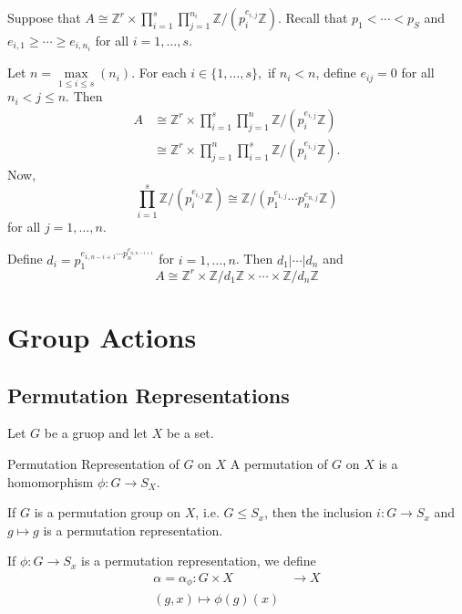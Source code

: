 \documentclass{article}
\begin{document}
Suppose that $A \cong \mathbb{Z}^r \times \prod_{i=1}^s \prod_{j=1}^{n_i} \mathbb{Z}/(p_i^{e_{i,j}}\mathbb{Z})$. Recall that $p_1<\cdots < p_S$ and $e_{i,1}\ge \cdots \ge e_{i,n_i}$ for all $i=1,\dots, s$.

Let $n=\underset{1\le i \le s}{\max}(n_i)$. For each $i\in \{1,\dots, s\},$ if $n_i < n$, define $e_{ij}=0$ for all $n_i < j \le n$. Then
\begin{align*}
    A &\cong \mathbb{Z}^r \times \prod_{i=1}^s \prod_{j=1}^n \mathbb{Z}/(p_i^{e_{i,j}}\mathbb{Z}) \\ 
    &\cong \mathbb{Z}^r \times \prod_{j=1}^n \prod_{i=1}^s \mathbb{Z}/(p_i^{e_{i,j}}\mathbb{Z}). 
\end{align*}
Now,
\begin{equation*}
    \prod_{i=1}^s \mathbb{Z}/(p_i^{e_{i,j}}\mathbb{Z}) \cong \mathbb{Z}/(p_1^{e_{1,j}}\cdots p_n^{e_{n,j}}\mathbb{Z})
\end{equation*}
for all $j=1,\dots, n$.

Define $d_i = p_1^{e_{1,n-i+1}\cdots p_n^{e_{n,n-i+1}}}$ for $i=1,\dots, n$. Then $d_1|\cdots | d_n$ and
\begin{equation*}
    A \cong \mathbb{Z}^r \times \mathbb{Z}/d_1\mathbb{Z} \times \cdots \times \mathbb{Z}/d_n\mathbb{Z}
\end{equation*}

\section{Group Actions}
\subsection{Permutation Representations}
Let $G$ be a gruop and let $X$ be a set.
\begin{definition}{Permutation Representation of $G$ on $X$}
    A permutation of $G$ on $X$ is a homomorphism $\phi:G\rightarrow S_X$.
\end{definition}
\begin{example}
    If $G$ is a permutation group on $X$, i.e. $G \le S_x$, then the inclusion $i:G\rightarrow S_x$ and $g\mapsto g$ is a permutation representation.
\end{example}
If $\phi:G\rightarrow S_x$ is a permutation representation, we define
\begin{align*}
    \alpha = \alpha_\phi: G \times X &\rightarrow X \\ 
    (g,x) \mapsto \phi(g)(x)
\end{align*}
\end{document}
